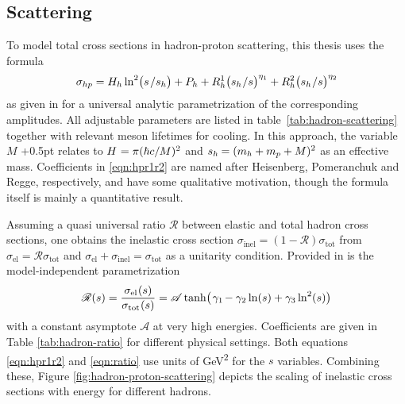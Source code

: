 \begin{spacing}{0.985}
	
	
	\subsection{Scattering}
	\label{sub:scattering}
	
	To model total cross sections in hadron-proton scattering, this thesis uses the formula
	\begin{equation}
		\sigma_{hp} = H_h \ln^2 \bigl( s \kern+1.0pt / s_h \bigr) + P_h +
		R_h^1 \bigl( s_h \kern+0.5pt / s \bigr)^{\eta_1} + R_h^2 \bigl( s_h \kern+0.5pt / s \bigr)^{\eta_2}
		\label{eqn:hpr1r2}
	\end{equation}
	as given in \cite{Belousov_2016} for a universal analytic parametrization of the corresponding amplitudes.
	All adjustable parameters are listed in table~\ref{tab:hadron-scattering} together with relevant meson lifetimes for
	cooling. In this approach, the variable $M$ \kern+0.5pt relates to $H \kern+0.5pt = \pi (\hbar c / M)^2$ and
	$s_h \kern-0.5pt = (m_h + m_p + M)^2$ as an effective mass. Coefficients in \eqref{eqn:hpr1r2} are named after Heisenberg,
	Pomeranchuk and Regge, respectively, and have some qualitative motivation, though the formula itself is mainly a quantitative
	result.
	\enlargethispage{\baselineskip}\newpage
\end{spacing}



Assuming a quasi universal ratio $\mathscr{R}$ between elastic and total hadron cross sections, one obtains the inelastic
cross section $\sigma_\text{inel} = (1 - \mathscr{R}) \sigma_\text{tot}$ from $\sigma_\text{el} = \mathscr{R} \sigma_\text{tot}$
and $\sigma_\text{el} + \sigma_\text{inel} = \sigma_\text{tot}$ as a unitarity condition. Provided in \cite{Fagundes_2012} is
the model-independent parametrization
\begin{equation}
	\mathscr{R}(s) = \frac{\sigma_{\text{el}\kern+0.5pt} (s)}{\sigma_{\text{tot}\kern+0.5pt} (s)} =
	\mathscr{A} \tanh \bigl( \kern+1.0pt \gamma_1 \kern-1.0pt - \gamma_2 \ln (s) + \gamma_3 \ln^2 (s) \bigr)
	\label{eqn:ratio}
\end{equation}
with a constant asymptote $\mathscr{A}$ at very high energies. Coefficients are given in Table \ref{tab:hadron-ratio} for
different physical settings. Both equations \eqref{eqn:hpr1r2} and \eqref{eqn:ratio} use units of \unit{\giga\electronvolt\squared}
for the $s$  variables. Combining these, Figure \ref{fig:hadron-proton-scattering} depicts the scaling of inelastic cross sections
with energy for different hadrons.

